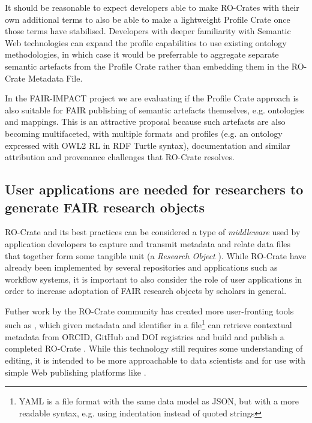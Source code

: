 It should be reasonable to expect developers able to make RO-Crates with their own additional terms to also be able to make a lightweight Profile Crate once those terms have stabilised. Developers with deeper familiarity with Semantic Web technologies can expand the profile capabilities to use existing ontology methodologies, in which case it would be preferrable to aggregate separate semantic artefacts from the Profile Crate rather than embedding them in the RO-Crate Metadata File.

In the FAIR-IMPACT project we are evaluating if the Profile Crate approach is also suitable for FAIR publishing of semantic artefacts themselves, e.g. ontologies and mappings. This is an attractive proposal because such artefacts are also becoming multifaceted, with multiple formats and profiles (e.g. an ontology expressed with OWL2 RL in RDF Turtle syntax), documentation and similar attribution and provenance challenges that RO-Crate resolves.


\subsection{User applications are needed for researchers to generate FAIR research objects}

RO-Crate and its best practices can be considered a type of \emph{middleware} used by application developers to capture and transmit metadata and relate data files that together form some tangible unit (a \emph{Research Object} \cite{Bechhofer 2013}). While RO-Crate have already been implemented by several repositories and applications such as workflow systems, it is important to also consider the role of user applications in order to increase adoptation of FAIR research objects by scholars in general.

Futher work by the RO-Crate community has created more user-fronting tools such as , which given metadata and identifier in a  file\footnote{YAML is a file format with the same data model as JSON, but with a more readable syntax, e.g. using indentation instead of quoted strings} can retrieve contextual metadata from ORCID, GitHub and DOI registries and build and publish a completed RO-Crate \cite{ya2ro}.   
While this technology still requires some understanding of editing, it is intended to be more approachable to data scientists and for use with simple Web publishing platforms like .

